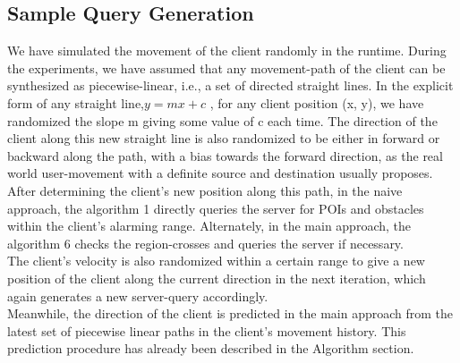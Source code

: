 \subsection{Sample Query Generation}
We have simulated the movement of the client randomly in the runtime. During the experiments, we have assumed that any movement-path of the client can be synthesized as piecewise-linear, i.e., a set of directed straight lines. In the explicit form of any straight line,$ y=mx+c$ , for any client position (x, y), we have randomized the slope m giving some value of c each time. The direction of the client along this new straight line is also randomized to be either in forward or backward along the path, with a bias towards the forward direction, as the real world user-movement with a definite source and destination usually proposes.\\
After determining the client’s new position along this path, in the naive approach, the algorithm 1 directly queries the server for POIs and obstacles within the client’s alarming range. Alternately, in the main approach, the algorithm 6 checks the region-crosses and queries the server if necessary.\\
The client’s velocity is also randomized within a certain range to give a new position of the client along the current direction in the next iteration, which again generates a new server-query accordingly.\\
Meanwhile, the direction of the client is predicted in the main approach from the latest set of piecewise linear paths in the client’s movement history. This prediction procedure has already been described in the  Algorithm section.\\

